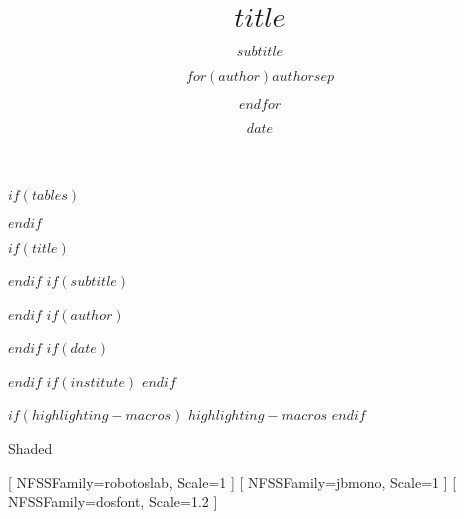 \usepackage{fontspec}         %
\usepackage[skins]{tcolorbox} %
\usepackage{tikz}             %
\usepackage{calc}             %
\usepackage[
    $if(lang)$$lang$$else$de-DE$endif$
]{datetime2}                  %
\usepackage{beamerbaseframe}
\usepackage{beamerbasemisc}
\usepackage{beamerbasetemplates}
\usetikzlibrary{calc}         %

\usepackage{hyperref} %
\usepackage{ulem}     %
\providecommand{\tightlist}{\setlength{\itemsep}{0pt}\setlength{\parskip}{0pt}}

$if(tables)$
\usepackage{longtable,booktabs,array}
\usepackage{beamerbasetitle}
\usepackage{beamerbasesection}
\usepackage{beamerbaseoverlay}
$endif$


$if(title)$
\title{$title$}
$endif$
$if(subtitle)$
\subtitle{$subtitle$}
$endif$
$if(author)$
\author{$for(author)$$author$$sep$ \and $endfor$}
$endif$
$if(date)$
\date{$date$}
$endif$
$if(institute)$
$endif$

$if(highlighting-macros)$
$highlighting-macros$
$endif$

\ifcsname Shaded\endcsname
\else
    \newenvironment{Shaded}{}{}
\fi
{}

[ %
    NFSSFamily=robotoslab,
    Scale=1
]
[ %
    NFSSFamily=jbmono,
    Scale=1
]
[ %
    NFSSFamily=dosfont,
    Scale=1.2
]

